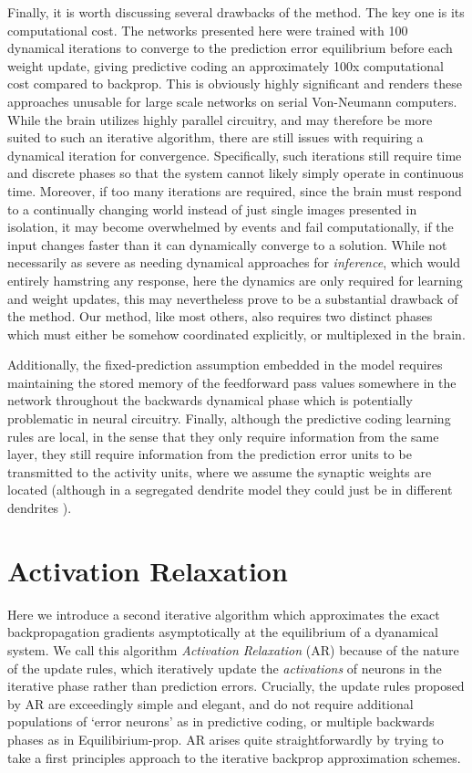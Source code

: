 Finally, it is worth discussing several drawbacks of the method. The key one is its computational cost. The networks presented here were trained with 100 dynamical iterations to converge to the prediction error equilibrium before each weight update, giving predictive coding an approximately 100x computational cost compared to backprop. This is obviously highly significant and renders these approaches unusable for large scale networks on serial Von-Neumann computers. While the brain utilizes highly parallel circuitry, and may therefore be more suited to such an iterative algorithm, there are still issues with requiring a dynamical iteration for convergence. Specifically, such iterations still require time and discrete phases so that the system cannot likely simply operate in continuous time. Moreover, if too many iterations are required, since the brain must respond to a continually changing world instead of just single images presented in isolation, it may become overwhelmed by events and fail computationally, if the input changes faster than it can dynamically converge to a solution. While not necessarily as severe as needing dynamical approaches for \emph{inference}, which would entirely hamstring any response, here the dynamics are only required for learning and weight updates, this may nevertheless prove to be a substantial drawback of the method. Our method, like most others, also requires two distinct phases which must either be somehow coordinated explicitly, or multiplexed in the brain.

Additionally, the fixed-prediction assumption embedded in the model requires maintaining the stored memory of the feedforward pass values somewhere in the network throughout the backwards dynamical phase which is potentially problematic in neural circuitry. Finally, although the predictive coding learning rules are local, in the sense that they only require information from the same layer, they still require information from the prediction error units to be transmitted to the activity units, where we assume the synaptic weights are located (although in a segregated dendrite model they could just be in different dendrites \citep{sacramento2018dendritic}).

\section{Activation Relaxation}
Here we introduce a second iterative algorithm which approximates the exact backpropagation gradients asymptotically at the equilibrium of a dyanamical system. We call this algorithm \emph{Activation Relaxation} (AR) because of the nature of the update rules, which iteratively update the \emph{activations} of neurons in the iterative phase rather than prediction errors. Crucially, the update rules proposed by AR are exceedingly simple and elegant, and do not require additional populations of `error neurons' as in predictive coding, or multiple backwards phases as in Equilibirium-prop. AR arises quite straightforwardly by trying to take a first principles approach to the iterative backprop approximation schemes.

